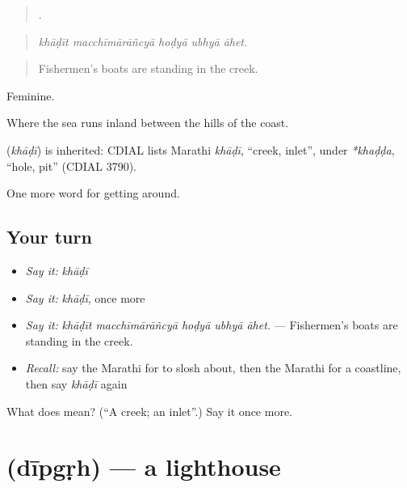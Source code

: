 \begin{quote}
    .
\end{quote}

\begin{quote}
\emph{khāḍīt macchīmārāñcyā hoḍyā ubhyā āhet.}
\end{quote}

\begin{quote}
Fishermen’s boats are standing in the creek.
\end{quote}

Feminine.

Where the sea runs inland between the hills of the coast.

\begin{cousinweb}
\textbf{} (\emph{khāḍī}) is inherited: CDIAL lists Marathi \emph{khāḍī}, \textquotedblleft{}creek, inlet\textquotedblright{}, under \emph{*khaḍḍa}, \textquotedblleft{}hole, pit\textquotedblright{} (CDIAL 3790).
\end{cousinweb}

\begin{grammarlens}[title={What you've built}]
One more word for getting around.
\end{grammarlens}

\subsection*{Your turn}
\begin{itemize}
\raggedright
  \item \emph{Say it:} \emph{khāḍī}
  \item \emph{Say it:} \emph{khāḍī}, once more
  \item \emph{Say it:} \emph{khāḍīt macchīmārāñcyā hoḍyā ubhyā āhet.} — Fishermen’s boats are standing in the creek.
  \item \emph{Recall:} say the Marathi for to slosh about, then the Marathi for a coastline, then say \emph{khāḍī} again
\end{itemize}

\begin{tcolorbox}[breakable,colback=teal!4,colframe=teal!35!black,title={Before you move on}]
What does  mean? (\textquotedblleft{}A creek; an inlet\textquotedblright{}.) Say it once more.
\end{tcolorbox}
\section[\texorpdfstring{\mr{दीपगृह} (dīpgṛh)}{दीपगृह (dīpgṛh)}]{ (dīpgṛh) — a lighthouse}

